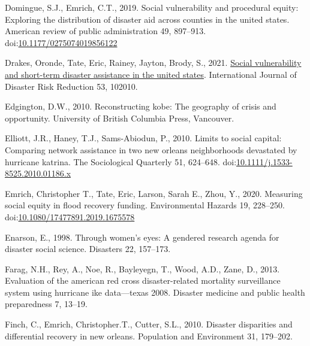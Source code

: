 \documentclass[]{elsarticle} %
\newlength{\cslhangindent}
\newlength{\cslentryspacingunit} %
\newenvironment{CSLReferences}[2] %
 {%
  \setlength{\parindent}{0pt}
  \ifodd #1
  \let\oldpar\par
  \def\par{\hangindent=\cslhangindent\oldpar}
  \fi
  \setlength{\parskip}{#2\cslentryspacingunit}
 }%
 {}
\begin{document}
\begin{CSLReferences}{1}{0}
\leavevmode{}%
Domingue, S.J., Emrich, C.T., 2019. Social vulnerability and procedural
equity: Exploring the distribution of disaster aid across counties in
the united states. American review of public administration 49,
897--913.
doi:\href{https://doi.org/10.1177/0275074019856122}{10.1177/0275074019856122}

\leavevmode{}%
Drakes, Oronde, Tate, Eric, Rainey, Jayton, Brody, S., 2021.
\href{https://doi.org/10.1016/j.ijdrr.2020.102010}{Social vulnerability
and short-term disaster assistance in the united states}. International
Journal of Disaster Risk Reduction 53, 102010.

\leavevmode{}%
Edgington, D.W., 2010. Reconstructing kobe: The geography of crisis and
opportunity. University of British Columbia Press, Vancouver.

\leavevmode{}%
Elliott, J.R., Haney, T.J., Sams-Abiodun, P., 2010. Limits to social
capital: Comparing network assistance in two new orleans neighborhoods
devastated by hurricane katrina. The Sociological Quarterly 51,
624--648.
doi:\href{https://doi.org/10.1111/j.1533-8525.2010.01186.x}{10.1111/j.1533-8525.2010.01186.x}

\leavevmode{}%
Emrich, Christopher T., Tate, Eric, Larson, Sarah E., Zhou, Y., 2020.
Measuring social equity in flood recovery funding. Environmental Hazards
19, 228--250.
doi:\href{https://doi.org/10.1080/17477891.2019.1675578}{10.1080/17477891.2019.1675578}

\leavevmode{}%
Enarson, E., 1998. Through women's eyes: A gendered research agenda for
disaster social science. Disasters 22, 157--173.

\leavevmode{}%
Farag, N.H., Rey, A., Noe, R., Bayleyegn, T., Wood, A.D., Zane, D.,
2013. Evaluation of the american red cross disaster-related mortality
surveillance system using hurricane ike data---texas 2008. Disaster
medicine and public health preparedness 7, 13--19.

\leavevmode{}%
Finch, C., Emrich, Christopher.T., Cutter, S.L., 2010. Disaster
disparities and differential recovery in new orleans. Population and
Environment 31, 179--202.


\end{CSLReferences}
\end{document}
